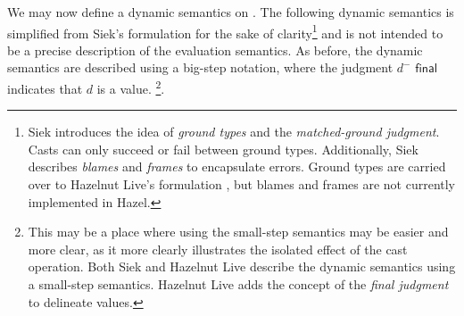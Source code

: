 We may now define a dynamic semantics on \gtclc. The following dynamic semantics is simplified from Siek's formulation for the sake of clarity\footnote{Siek \cite{siek2015refined} introduces the idea of \textit{ground types} and the \textit{matched-ground judgment}. Casts can only succeed or fail between ground types. Additionally, Siek describes \textit{blames} and \textit{frames} to encapsulate errors. Ground types are carried over to Hazelnut Live's formulation \cite{conf/popl/HazelnutLive19}, but blames and frames are not currently implemented in Hazel.} and is not intended to be a precise description of the evaluation semantics. As before, the dynamic semantics are described using a big-step notation, where the judgment $d^-\textsf{ final}$ indicates that $d$ is a value. \footnote{This may be a place where using the small-step semantics may be easier and more clear, as it more clearly illustrates the isolated effect of the cast operation. Both Siek \cite{Siek06gradualtyping,siek2015refined} and Hazelnut Live \cite{conf/popl/HazelnutLive19} describe the dynamic semantics using a small-step semantics. Hazelnut Live adds the concept of the \textit{final judgment} to delineate values.}.

\begin{singlespace}
\end{singlespace}

